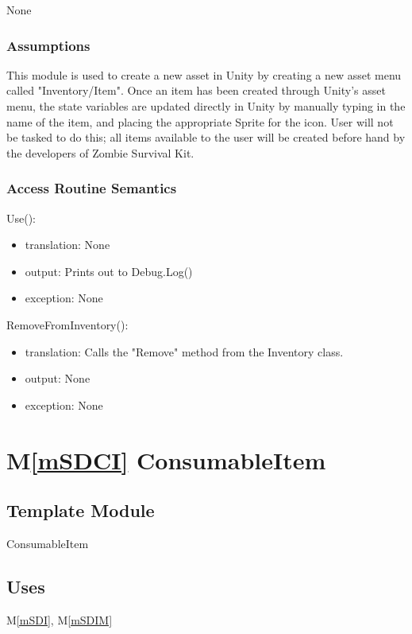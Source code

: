 \documentclass[12pt]{article}
\newcommand{\mref}[1]{M\ref{#1}}
\begin{document}
None

\subsubsection* {Assumptions}

This module is used to create a new asset in Unity by creating a new asset menu called "Inventory/Item". Once an item has been created through Unity's asset menu, the state variables are updated directly in Unity by manually typing in the name of the item, and placing the appropriate Sprite for the icon. User will not be tasked to do this; all items available to the user will be created before hand by the developers of Zombie Survival Kit.

\subsubsection* {Access Routine Semantics}

\noindent Use():
\begin{itemize}
\item translation: None
\item output: Prints out to Debug.Log()
\item exception: None
\end{itemize}

\noindent RemoveFromInventory():
\begin{itemize}
\item translation: Calls the "Remove" method from the Inventory class.
\item output: None
\item exception: None
\end{itemize}

\newpage

\section* {\mref{mSDCI} ConsumableItem}

\subsection*{Template Module}

ConsumableItem

\subsection* {Uses}

\mref{mSDI}, \mref{mSDIM}
\end{document}
